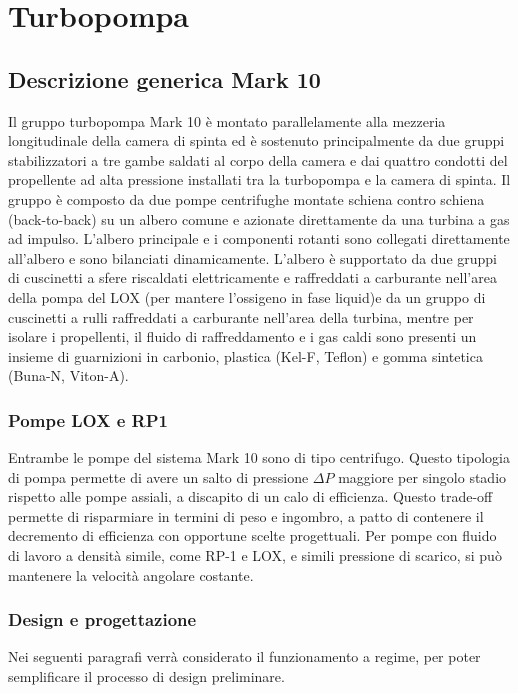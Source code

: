 \section{Turbopompa}
\label{sec:turbopompa}

\subsection{Descrizione generica Mark 10}
Il gruppo turbopompa Mark 10 è montato parallelamente alla mezzeria longitudinale della camera di spinta ed è sostenuto principalmente da due gruppi stabilizzatori a tre gambe saldati al corpo della camera e dai quattro condotti del propellente ad alta pressione installati tra la turbopompa e la camera di spinta. 
Il gruppo è composto da due pompe centrifughe montate schiena contro schiena (back-to-back) su un albero comune e azionate direttamente da una turbina a gas ad impulso.
L'albero principale e i componenti rotanti sono collegati direttamente all'albero e sono bilanciati dinamicamente.
L'albero è supportato da due gruppi di cuscinetti a sfere riscaldati elettricamente e raffreddati a carburante nell'area della pompa del LOX (per mantere l'ossigeno in fase liquid)e da un gruppo di cuscinetti a rulli raffreddati a carburante nell'area della turbina, mentre per isolare i propellenti, il fluido di raffreddamento e i gas caldi sono presenti un insieme di guarnizioni in carbonio, plastica (Kel-F, Teflon) e gomma sintetica (Buna-N, Viton-A).
\subsubsection{Pompe LOX e RP1}
Entrambe le pompe del sistema Mark 10 sono di tipo centrifugo. Questo tipologia di pompa permette di avere un salto di pressione $\Delta P$ maggiore per singolo stadio rispetto alle pompe assiali, a discapito di un calo di efficienza. Questo trade-off permette di risparmiare in termini di peso e ingombro, a patto di contenere il decremento di efficienza con opportune scelte progettuali. Per pompe con fluido di lavoro a densità simile, come RP-1 e LOX, e simili pressione di scarico, si può mantenere la velocità angolare costante. 

\subsubsection{Design e progettazione}
Nei seguenti paragrafi verrà considerato il funzionamento a regime, per poter semplificare il processo di design preliminare.

